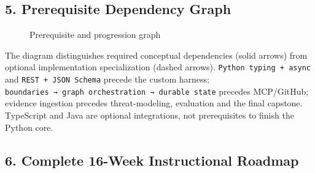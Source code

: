 \documentclass[
  10pt,
]{article}
\begin{document}
\subsection{5. Prerequisite Dependency
Graph}\label{prerequisite-dependency-graph}

\begin{figure}
\centering
{}
\caption{Prerequisite and progression graph}
\end{figure}

The diagram distinguishes required conceptual dependencies (solid
arrows) from optional implementation specialization (dashed arrows).
\texttt{Python\ typing\ +\ async} and \texttt{REST\ +\ JSON\ Schema}
precede the custom harness;
\texttt{boundaries\ →\ graph\ orchestration\ →\ durable\ state} precedes
MCP/GitHub; evidence ingestion precedes threat-modeling, evaluation and
the final capstone. TypeScript and Java are optional integrations, not
prerequisites to finish the Python core.

\subsection{6. Complete 16-Week Instructional
Roadmap}\label{complete-16-week-instructional-roadmap}
\end{document}
